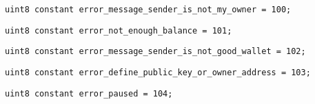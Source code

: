 \begin{lstlisting}[firstnumber=4]
    uint8 constant error_message_sender_is_not_my_owner = 100;
\end{lstlisting}

\begin{lstlisting}[firstnumber=5]
    uint8 constant error_not_enough_balance = 101;
\end{lstlisting}

\begin{lstlisting}[firstnumber=6]
    uint8 constant error_message_sender_is_not_good_wallet = 102;
\end{lstlisting}

\begin{lstlisting}[firstnumber=7]
    uint8 constant error_define_public_key_or_owner_address = 103;
\end{lstlisting}

\begin{lstlisting}[firstnumber=8]
    uint8 constant error_paused = 104;
\end{lstlisting}
